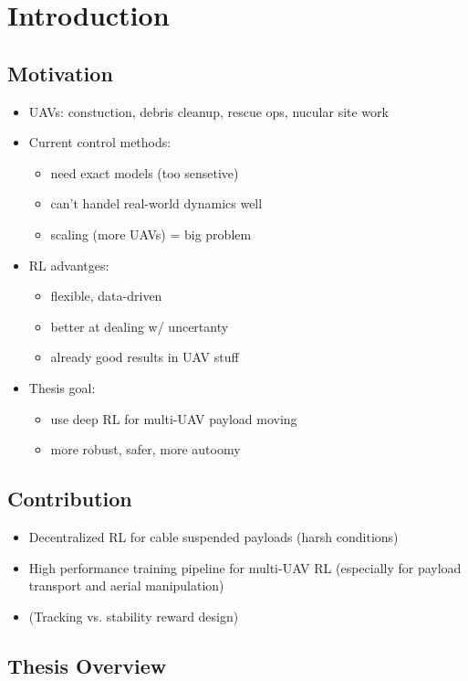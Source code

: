 \chapter{Introduction}

\section{Motivation}
\begin{itemize}
    \item UAVs: constuction, debris cleanup, rescue ops, nucular site work
    
    \item Current control methods:
    \begin{itemize}
        \item need exact models (too sensetive)
        \item can't handel real-world dynamics well
        \item scaling (more UAVs) = big problem
    \end{itemize}
    
    \item RL advantges:
    \begin{itemize}
        \item flexible, data-driven
        \item better at dealing w/ uncertanty
        \item already good results in UAV stuff
    \end{itemize}
    
    \item Thesis goal:
    \begin{itemize}
        \item use deep RL for multi-UAV payload moving
        \item more robust, safer, more autoomy
    \end{itemize}
\end{itemize}
\section{Contribution}
\begin{itemize}
    \item Decentralized RL for cable suspended payloads (harsh conditions)
    \item High performance training pipeline for multi-UAV RL (especially for payload transport and aerial manipulation)
    \item (Tracking vs. stability reward design)
\end{itemize}
\section{Thesis Overview}

